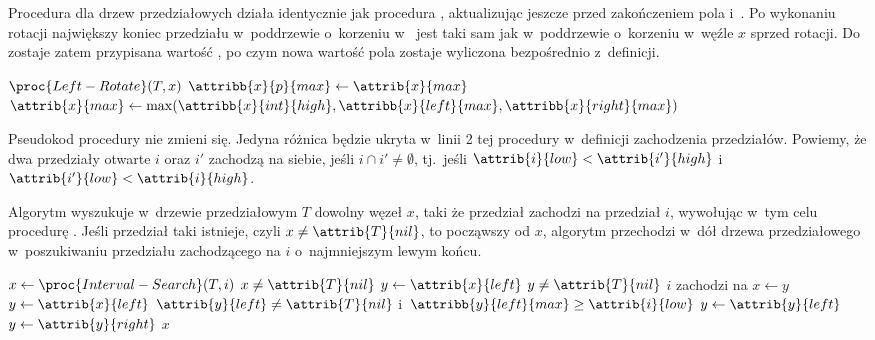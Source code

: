 
\exercise %
Procedura  dla drzew przedziałowych działa identycznie jak procedura , aktualizując jeszcze przed zakończeniem pola  i~.
Po wykonaniu rotacji największy koniec przedziału w~poddrzewie o~korzeniu w~ jest taki sam jak w~poddrzewie o~korzeniu w~węźle $x$ sprzed rotacji.
Do  zostaje zatem przypisana wartość , po czym nowa wartość pola  zostaje wyliczona bezpośrednio z~definicji.
\begin{codebox}
\li	$\proc{Left-Rotate}(T,x)$
\li	$\attribb{x}{p}{max}\gets\attrib{x}{max}$
\li	$\attrib{x}{max}\gets\max(\attribb{x}{int}{high},\attribb{x}{left}{max},\attribb{x}{right}{max})$
\end{codebox}

\exercise %
Pseudokod procedury  nie zmieni się.
Jedyna różnica będzie ukryta w~linii 2 tej procedury w~definicji zachodzenia przedziałów.
Powiemy, że dwa przedziały otwarte $i$ oraz $i'$ zachodzą na siebie, jeśli $i\cap i'\ne\emptyset$, tj.\ jeśli $\attrib{i}{low}<\attrib{i'}{high}$ i~$\attrib{i'}{low}<\attrib{i}{high}$.

\exercise %
Algorytm wyszukuje w~drzewie przedziałowym $T$ dowolny węzeł $x$, taki że przedział  zachodzi na przedział $i$, wywołując w~tym celu procedurę .
Jeśli przedział taki istnieje, czyli $x\ne\attrib{T}{nil}$, to począwszy od $x$, algorytm przechodzi w~dół drzewa przedziałowego w~poszukiwaniu przedziału zachodzącego na $i$ o~najmniejszym lewym końcu.
\begin{codebox}
\li $x\gets\proc{Interval-Search}(T,i)$
\li \If $x\ne\attrib{T}{nil}$
\li 	\Then $y\gets\attrib{x}{left}$
\li			\While $y\ne\attrib{T}{nil}$ \label{li:min-interval-search-while-begin}
\li				\Do \If $i$ zachodzi na  \label{li:min-interval-search-overlap-test}
\li						\Then $x\gets y$
\li							$y\gets\attrib{x}{left}$ \label{li:min-interval-search-y-modification}
\li						\Else \If $\attrib{y}{left}\ne\attrib{T}{nil}$ i~$\attribb{y}{left}{max}\ge\attrib{i}{low}$ \label{li:min-interval-search-no-overlap-begin}
\li							\Then $y\gets\attrib{y}{left}$
\li							\Else $y\gets\attrib{y}{right}$
							\End \label{li:min-interval-search-no-overlap-end}
						\End
				\End \label{li:min-interval-search-while-end}
		\End
\li	\Return $x$
\end{codebox}


